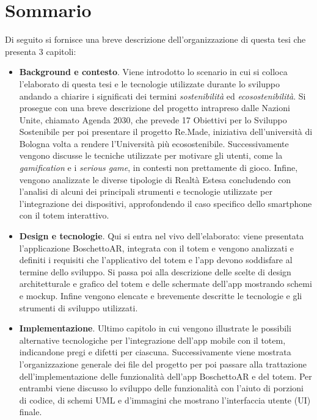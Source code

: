 \section*{Sommario}
Di seguito si fornisce una breve descrizione dell'organizzazione di questa tesi che presenta 3 capitoli: 
\begin{itemize}
    \itemsep1em
    \item \textbf{Background e contesto}. Viene introdotto lo scenario in cui si colloca l'elaborato di questa tesi e le tecnologie utilizzate durante lo sviluppo andando a chiarire i significati dei termini \textit{sostenibilità} ed \textit{ecosostenibilità}. Si prosegue con una breve descrizione del progetto intrapreso dalle Nazioni Unite, chiamato Agenda 2030, che prevede 17 Obiettivi per lo Sviluppo Sostenibile per poi presentare il progetto Re.Made, iniziativa dell'università di Bologna volta a rendere l'Università più ecosostenibile.
    Successivamente vengono discusse le tecniche utilizzate per motivare gli utenti, come la \textit{gamification} e i \textit{serious game}, in contesti non prettamente di gioco. Infine, vengono analizzate le diverse tipologie di Realtà Estesa concludendo con l'analisi di alcuni dei principali strumenti e tecnologie utilizzate per l'integrazione dei dispositivi, approfondendo il caso specifico dello smartphone con il totem interattivo.
    \item \textbf{Design e tecnologie}. Qui si entra nel vivo dell'elaborato: viene presentata l'applicazione BoschettoAR, integrata con il totem e vengono analizzati e definiti i requisiti che l'applicativo del totem e l'app devono soddisfare al termine dello sviluppo. Si passa poi alla descrizione delle scelte di design architetturale e grafico del totem e delle schermate dell'app mostrando schemi e mockup. Infine vengono elencate e brevemente descritte le tecnologie e gli strumenti di sviluppo utilizzati.
    \item \textbf{Implementazione}. Ultimo capitolo in cui vengono illustrate le possibili alternative tecnologiche per l'integrazione dell'app mobile con il totem, indicandone pregi e difetti per ciascuna. Successivamente viene mostrata l'organizzazione generale dei file del progetto per poi passare alla trattazione dell'implementazione delle funzionalità dell'app BoschettoAR e del totem.
    Per entrambi viene discusso lo sviluppo delle funzionalità con l'aiuto di porzioni di codice, di schemi UML e d'immagini che mostrano l'interfaccia utente (UI) finale.
\end{itemize}